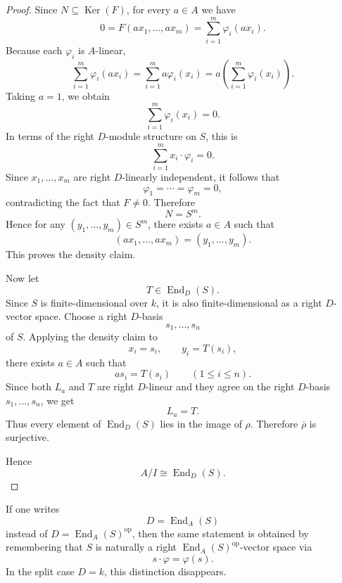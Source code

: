 \begin{proof}
    Since \(N\subseteq \operatorname{Ker}(F)\), for every \(a\in A\) we have
    \[
        0
        =
        F(ax_1,\dots,ax_m)
        =
        \sum_{i=1}^m \varphi_i(ax_i).
    \]
    Because each \(\varphi_i\) is \(A\)-linear,
    \[
        \sum_{i=1}^m \varphi_i(ax_i)
        =
        \sum_{i=1}^m a\varphi_i(x_i)
        =
        a\left(\sum_{i=1}^m \varphi_i(x_i)\right).
    \]
    Taking \(a=1\), we obtain
    \[
        \sum_{i=1}^m \varphi_i(x_i)=0.
    \]
    In terms of the right \(D\)-module structure on \(S\), this is
    \[
        \sum_{i=1}^m x_i\cdot \varphi_i=0.
    \]
    Since \(x_1,\dots,x_m\) are right \(D\)-linearly independent, it follows that
    \[
        \varphi_1=\cdots=\varphi_m=0,
    \]
    contradicting the fact that \(F\neq 0\). Therefore
    \[
        N=S^m.
    \]
    Hence for any \((y_1,\dots,y_m)\in S^m\), there exists \(a\in A\) such that
    \[
        (ax_1,\dots,ax_m)=(y_1,\dots,y_m).
    \]
    This proves the density claim.

    Now let
    \[
        T\in \operatorname{End}_D(S).
    \]
    Since \(S\) is finite-dimensional over \(k\), it is also finite-dimensional as a
    right \(D\)-vector space. Choose a right \(D\)-basis
    \[
        s_1,\dots,s_n
    \]
    of \(S\). Applying the density claim to
    \[
        x_i=s_i,
        \qquad
        y_i=T(s_i),
    \]
    there exists \(a\in A\) such that
    \[
        as_i=T(s_i)
        \qquad
        (1\leq i\leq n).
    \]
    Since both \(L_a\) and \(T\) are right \(D\)-linear and they agree on the
    right \(D\)-basis \(s_1,\dots,s_n\), we get
    \[
        L_a=T.
    \]
    Thus every element of \(\operatorname{End}_D(S)\) lies in the image of \(\rho\).
    Therefore \(\overline{\rho}\) is surjective.

    Hence
    \[
        A/I\cong \operatorname{End}_D(S).
    \]
\end{proof}

\begin{remark}
    If one writes
    \[
        D=\operatorname{End}_A(S)
    \]
    instead of \(D=\operatorname{End}_A(S)^{\operatorname{op}}\), then the same statement
    is obtained by remembering that \(S\) is naturally a right
    \(\operatorname{End}_A(S)^{\operatorname{op}}\)-vector space via
    \[
        s\cdot \varphi=\varphi(s).
    \]
    In the split case \(D=k\), this distinction disappears.
\end{remark}

